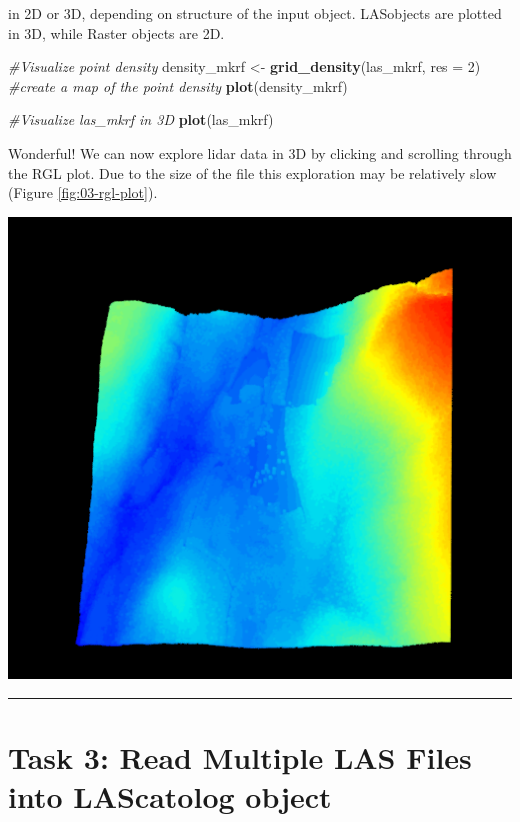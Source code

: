 \documentclass[
]{book}
\newenvironment{Shaded}{\begin{snugshade}}{\end{snugshade}}
\newcommand{\AttributeTok}[1]{\textcolor[rgb]{0.13,0.29,0.53}{#1}}
\newcommand{\CommentTok}[1]{\textcolor[rgb]{0.56,0.35,0.01}{\textit{#1}}}
\newcommand{\DecValTok}[1]{\textcolor[rgb]{0.00,0.00,0.81}{#1}}
\newcommand{\FunctionTok}[1]{\textcolor[rgb]{0.13,0.29,0.53}{\textbf{#1}}}
\newcommand{\NormalTok}[1]{#1}
\newcommand{\OtherTok}[1]{\textcolor[rgb]{0.56,0.35,0.01}{#1}}
\begin{document}
in 2D or 3D, depending on structure of the input object. LASobjects are plotted in 3D, while Raster objects are 2D.

\begin{Shaded}
\begin{Highlighting}[]
\CommentTok{\#Visualize point density }
\NormalTok{density\_mkrf }\OtherTok{\textless{}{-}} \FunctionTok{grid\_density}\NormalTok{(las\_mkrf, }\AttributeTok{res =} \DecValTok{2}\NormalTok{) }\CommentTok{\#create a map of the point density}
\FunctionTok{plot}\NormalTok{(density\_mkrf) }

\CommentTok{\#Visualize las\_mkrf in 3D }
\FunctionTok{plot}\NormalTok{(las\_mkrf)}
\end{Highlighting}
\end{Shaded}

Wonderful! We can now explore lidar data in 3D by clicking and scrolling through the RGL plot. Due to the size of the file this exploration may be relatively slow (Figure \ref{fig:03-rgl-plot}).

\begin{center}\includegraphics[width=1\linewidth]{images/03-rgl-plot} \end{center}

\begin{center}\rule{0.5\linewidth}{0.5pt}\end{center}

\hypertarget{task-3-read-multiple-las-files-into-lascatolog-object}{%
\section*{Task 3: Read Multiple LAS Files into LAScatolog object}\label{task-3-read-multiple-las-files-into-lascatolog-object}}
\end{document}
